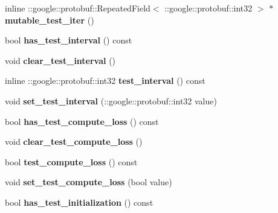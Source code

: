 \begin{DoxyCompactItemize}
inline \+::google\+::protobuf\+::\+Repeated\+Field$<$ \+::google\+::protobuf\+::int32 $>$ $\ast$ {\bfseries mutable\+\_\+test\+\_\+iter} ()
\item 
\mbox{\label{classcaffe_1_1_solver_parameter_a7b473e6a41044d8d6cf7ba1a120b3add}} 
bool {\bfseries has\+\_\+test\+\_\+interval} () const
\item 
\mbox{\label{classcaffe_1_1_solver_parameter_ac3e6c2a684d7d525c6742301e4c06263}} 
void {\bfseries clear\+\_\+test\+\_\+interval} ()
\item 
\mbox{\label{classcaffe_1_1_solver_parameter_ad366b9a3430ccf789bcf574e5254a4a7}} 
inline \+::google\+::protobuf\+::int32 {\bfseries test\+\_\+interval} () const
\item 
\mbox{\label{classcaffe_1_1_solver_parameter_a536c67317f2e5ec13361ac4dfd82aec3}} 
void {\bfseries set\+\_\+test\+\_\+interval} (\+::google\+::protobuf\+::int32 value)
\item 
\mbox{\label{classcaffe_1_1_solver_parameter_ab8ee38401fbdf7d106d3b38b132ca4c3}} 
bool {\bfseries has\+\_\+test\+\_\+compute\+\_\+loss} () const
\item 
\mbox{\label{classcaffe_1_1_solver_parameter_a98ed260f24c8f5cb78ebbf96c538ff60}} 
void {\bfseries clear\+\_\+test\+\_\+compute\+\_\+loss} ()
\item 
\mbox{\label{classcaffe_1_1_solver_parameter_a11ef5f9f878cfc108192cd6408d35e89}} 
bool {\bfseries test\+\_\+compute\+\_\+loss} () const
\item 
\mbox{\label{classcaffe_1_1_solver_parameter_a8c9fc46d69b0a6400b13bb95437a9375}} 
void {\bfseries set\+\_\+test\+\_\+compute\+\_\+loss} (bool value)
\item 
\mbox{\label{classcaffe_1_1_solver_parameter_ab376a3da3dfbeadaa4c8a267383441ef}} 
bool {\bfseries has\+\_\+test\+\_\+initialization} () const
\item 

\end{DoxyCompactItemize}

